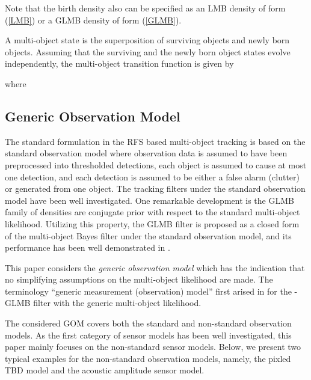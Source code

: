 \documentclass[journal]{IEEEtran}
\begin{document}
Note that  the birth density  also can be specified as an LMB density of form (\ref{LMB}) or a  GLMB density of form (\ref{GLMB}).


A multi-object state  is  the superposition of surviving objects and  newly born objects. Assuming that the surviving and the newly born object states evolve independently, the multi-object transition function is given by~\cite{refr:label_2}
 
where
 
 
\subsection{Generic Observation Model}
The standard formulation in the RFS based multi-object tracking is based on the standard observation model \cite{refr:tracking-2} where observation data is assumed to have been preprocessed into thresholded detections,  each object is assumed to cause at most one detection, and each detection is assumed to be either a false alarm (clutter) or generated from one object. The tracking filters under the standard observation model have  been well investigated. One remarkable development is    the GLMB family of densities are conjugate prior with respect to the standard multi-object likelihood. Utilizing this property, the GLMB filter is proposed as a closed form of the multi-object Bayes filter under the standard observation model, and its   performance has been well demonstrated in \cite{refr:label_1,refr:label_2}.

This paper considers the \textit{generic observation model }which  has the indication that  no simplifying assumptions on the multi-object likelihood are made. The terminology ``generic measurement (observation) model''  first arised in \cite{refr:label_6} for  the -GLMB filter with the  generic multi-object likelihood.




The  considered GOM  covers both the standard and non-standard observation models.  As the first  category of sensor models has been well  investigated, this paper mainly focuses on the non-standard  sensor models.  Below, we present two typical examples for the non-standard observation models, namely, the pixled TBD model
 and the acoustic amplitude sensor model.
 
\end{document}
